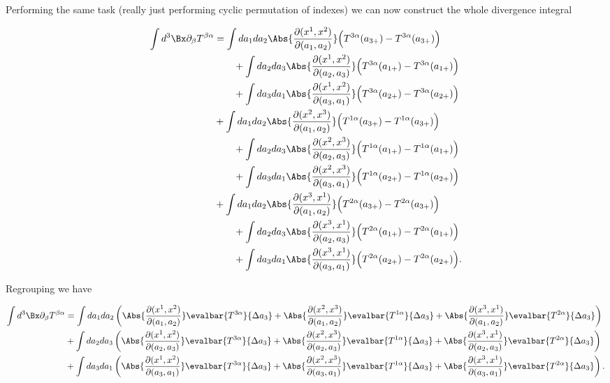 Performing the same task (really just performing cyclic permutation of indexes) we can now construct the whole divergence integral

\begin{align*}
\int d^3 \Bx \partial_\beta T^{\beta \alpha}
&=
\int da_1 da_2 \Abs{ \frac{\partial(x^1, x^2)}{\partial (a_1, a_2)}} 
\Bigl( T^{3 \alpha}(a_{3+}) - T^{3 \alpha}(a_{3+}) \Bigr) \\
&\qquad +
\int da_2 da_3 \Abs{ \frac{\partial(x^1, x^2)}{\partial (a_2, a_3)}} 
\Bigl( T^{3 \alpha}(a_{1+}) - T^{3 \alpha}(a_{1+}) \Bigr) \\
&\qquad +
\int da_3 da_1 \Abs{ \frac{\partial(x^1, x^2)}{\partial (a_3, a_1)}} 
\Bigl( T^{3 \alpha}(a_{2+}) - T^{3 \alpha}(a_{2+}) \Bigr) \\
&+\int da_1 da_2 \Abs{ \frac{\partial(x^2, x^3)}{\partial (a_1, a_2)}} 
\Bigl( T^{1 \alpha}(a_{3+}) - T^{1 \alpha}(a_{3+}) \Bigr) \\
&\qquad +
\int da_2 da_3 \Abs{ \frac{\partial(x^2, x^3)}{\partial (a_2, a_3)}} 
\Bigl( T^{1 \alpha}(a_{1+}) - T^{1 \alpha}(a_{1+}) \Bigr) \\
&\qquad +
\int da_3 da_1 \Abs{ \frac{\partial(x^2, x^3)}{\partial (a_3, a_1)}} 
\Bigl( T^{1 \alpha}(a_{2+}) - T^{1 \alpha}(a_{2+}) \Bigr) \\
&+\int da_1 da_2 \Abs{ \frac{\partial(x^3, x^1)}{\partial (a_1, a_2)}} 
\Bigl( T^{2 \alpha}(a_{3+}) - T^{2 \alpha}(a_{3+}) \Bigr) \\
&\qquad +
\int da_2 da_3 \Abs{ \frac{\partial(x^3, x^1)}{\partial (a_2, a_3)}} 
\Bigl( T^{2 \alpha}(a_{1+}) - T^{2 \alpha}(a_{1+}) \Bigr) \\
&\qquad +
\int da_3 da_1 \Abs{ \frac{\partial(x^3, x^1)}{\partial (a_3, a_1)}} 
\Bigl( T^{2 \alpha}(a_{2+}) - T^{2 \alpha}(a_{2+}) \Bigr).
\end{align*}

Regrouping we have

\begin{align*}
\int d^3 \Bx \partial_\beta T^{\beta \alpha}
&=
\int da_1 da_2 \left( 
\Abs{ \frac{\partial(x^1, x^2)}{\partial (a_1, a_2)}} 
\evalbar{T^{3 \alpha}}{\Delta a_3}
+\Abs{ \frac{\partial(x^2, x^3)}{\partial (a_1, a_2)}} 
\evalbar{T^{1 \alpha}}{\Delta a_3}
+\Abs{ \frac{\partial(x^3, x^1)}{\partial (a_1, a_2)}} 
\evalbar{T^{2 \alpha}}{\Delta a_3}
\right) \\
&+
\int da_2 da_3 \left( 
\Abs{ \frac{\partial(x^1, x^2)}{\partial (a_2, a_3)}} 
\evalbar{T^{3 \alpha}}{\Delta a_3}
+\Abs{ \frac{\partial(x^2, x^3)}{\partial (a_2, a_3)}} 
\evalbar{T^{1 \alpha}}{\Delta a_3}
+\Abs{ \frac{\partial(x^3, x^1)}{\partial (a_2, a_3)}} 
\evalbar{T^{2 \alpha}}{\Delta a_3}
\right) \\
&+
\int da_3 da_1 \left( 
\Abs{ \frac{\partial(x^1, x^2)}{\partial (a_3, a_1)}} 
\evalbar{T^{3 \alpha}}{\Delta a_3}
+\Abs{ \frac{\partial(x^2, x^3)}{\partial (a_3, a_1)}} 
\evalbar{T^{1 \alpha}}{\Delta a_3}
+\Abs{ \frac{\partial(x^3, x^1)}{\partial (a_3, a_1)}} 
\evalbar{T^{2 \alpha}}{\Delta a_3}
\right).
\end{align*}

